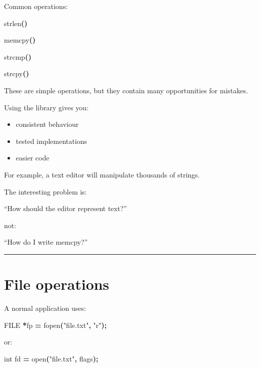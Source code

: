 \documentclass[
  oneside,
  openany]{book}
\newenvironment{Shaded}{\begin{snugshade}}{\end{snugshade}}
\newcommand{\DataTypeTok}[1]{\textcolor[rgb]{0.13,0.29,0.53}{#1}}
\newcommand{\NormalTok}[1]{#1}
\newcommand{\OperatorTok}[1]{\textcolor[rgb]{0.81,0.36,0.00}{\textbf{#1}}}
\newcommand{\StringTok}[1]{\textcolor[rgb]{0.31,0.60,0.02}{#1}}
\providecommand{\tightlist}{%
  \setlength{\itemsep}{0pt}\setlength{\parskip}{0pt}}
\begin{document}
Common operations:

\begin{Shaded}
\begin{Highlighting}[]
\NormalTok{strlen}\OperatorTok{()}

\NormalTok{memcpy}\OperatorTok{()}

\NormalTok{strcmp}\OperatorTok{()}

\NormalTok{strcpy}\OperatorTok{()}
\end{Highlighting}
\end{Shaded}

These are simple operations, but they contain many opportunities for
mistakes.

Using the library gives you:

\begin{itemize}
\tightlist
\item
  consistent behaviour
\item
  tested implementations
\item
  easier code
\end{itemize}

For example, a text editor will manipulate thousands of strings.

The interesting problem is:

``How should the editor represent text?''

not:

``How do I write memcpy?''

\begin{center}\rule{0.5\linewidth}{0.5pt}\end{center}

\hypertarget{file-operations}{%
\section{File operations}\label{file-operations}}

A normal application uses:

\begin{Shaded}
\begin{Highlighting}[]
\DataTypeTok{FILE} \OperatorTok{*}\NormalTok{fp }\OperatorTok{=}\NormalTok{ fopen}\OperatorTok{(}\StringTok{"file.txt"}\OperatorTok{,} \StringTok{"r"}\OperatorTok{);}
\end{Highlighting}
\end{Shaded}

or:

\begin{Shaded}
\begin{Highlighting}[]
\DataTypeTok{int}\NormalTok{ fd }\OperatorTok{=}\NormalTok{ open}\OperatorTok{(}\StringTok{"file.txt"}\OperatorTok{,}\NormalTok{ flags}\OperatorTok{);}
\end{Highlighting}
\end{Shaded}
\end{document}
